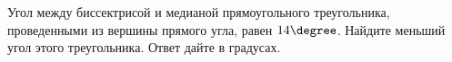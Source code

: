 \begin{ex}
	\begin{condition}
		 Угол между биссектрисой и медианой прямоугольного треугольника, проведенными из вершины прямого угла, равен \( 14\degree \). Найдите меньший угол этого треугольника. Ответ дайте в градусах.
	\end{condition}
\end{ex}